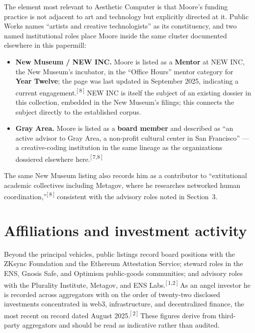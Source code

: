 \documentclass[11pt,letterpaper]{article}
\newcommand{\refn}[1]{\textsuperscript{[\,#1\,]}}
\begin{document}
The element most relevant to Aesthetic Computer is that Moore's funding
practice is not adjacent to art and technology but explicitly directed at it.
Public Works names ``artists and creative technologists'' as its constituency,
and two named institutional roles place Moore inside the same cluster
documented elsewhere in this papermill:

\begin{itemize}
\item \textbf{New Museum / NEW INC.} Moore is listed as a \textbf{Mentor} at
NEW INC, the New Museum's incubator, in the ``Office Hours'' mentor category
for \textbf{Year Twelve}; the page was last updated in September 2025,
indicating a current engagement.\refn{8} NEW INC is itself the subject of an
existing dossier in this collection, embedded in the New Museum's filings;
this connects the subject directly to the established corpus.
\item \textbf{Gray Area.} Moore is listed as a \textbf{board member} and
described as ``an active advisor to Gray Area, a non-profit cultural center
in San Francisco'' --- a creative-coding institution in the same lineage as
the organizations dossiered elsewhere here.\refn{7,8}
\end{itemize}

\noindent The same New Museum listing also records him as a contributor to
``extitutional academic collectives including Metagov, where he researches
networked human coordination,''\refn{8} consistent with the advisory roles
noted in Section~3.

\section{Affiliations and investment activity}

Beyond the principal vehicles, public listings record board positions with
the ZKsync Foundation and the Ethereum Attestation Service; steward roles in
the ENS, Gnosis Safe, and Optimism public-goods communities; and advisory
roles with the Plurality Institute, Metagov, and ENS Labs.\refn{1,2} As an
angel investor he is recorded across aggregators with on the order of
twenty-two disclosed investments concentrated in web3, infrastructure, and
decentralized finance, the most recent on record dated August 2025.\refn{2}
These figures derive from third-party aggregators and should be read as
indicative rather than audited.

\end{document}

